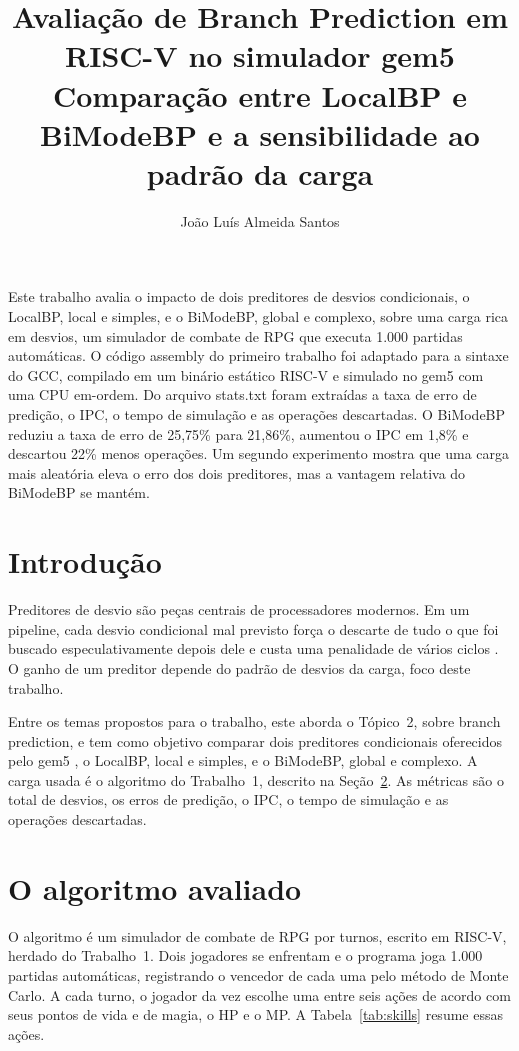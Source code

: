 \documentclass[12pt]{article}
\title{Avaliação de Branch Prediction em RISC-V no simulador gem5\\
Comparação entre LocalBP e BiModeBP e a sensibilidade ao padrão da carga}
\author{João Luís Almeida Santos\inst{1}}
\begin{document}
\maketitle

\begin{resumo}
  Este trabalho avalia o impacto de dois preditores de desvios
  condicionais, o LocalBP, local e simples, e o BiModeBP, global e
  complexo, sobre uma carga rica em desvios, um simulador de combate de RPG
  que executa 1.000 partidas automáticas.
  O código assembly do primeiro trabalho foi adaptado para a sintaxe do GCC,
  compilado em um binário estático RISC-V e simulado no gem5 com uma CPU
  em-ordem. Do arquivo stats.txt foram extraídas a taxa de erro de predição,
  o IPC, o tempo de simulação e as operações descartadas. O BiModeBP reduziu
  a taxa de erro de 25,75\% para 21,86\%, aumentou o IPC em 1,8\% e descartou
  22\% menos operações. Um segundo experimento mostra que uma carga mais
  aleatória eleva o erro dos dois preditores, mas a vantagem relativa do
  BiModeBP se mantém.
\end{resumo}

\section{Introdução}

Preditores de desvio são peças centrais de processadores modernos. Em um
pipeline, cada desvio condicional mal previsto força o descarte de tudo o
que foi buscado especulativamente depois dele e custa uma penalidade de
vários ciclos \cite{hennessy2017quantitative}. O ganho de um preditor
depende do padrão de desvios da carga, foco deste trabalho.

Entre os temas propostos para o trabalho, este aborda o Tópico~2, sobre
branch prediction, e tem como objetivo comparar dois preditores condicionais
oferecidos pelo gem5 \cite{binkert2011gem5}, o LocalBP, local e simples, e o
BiModeBP, global e complexo. A carga usada é o
algoritmo do Trabalho~1, descrito na Seção~\ref{sec:jogo}. As métricas
são o total de desvios, os erros de predição, o IPC, o tempo de simulação e
as operações descartadas.

\section{O algoritmo avaliado}
\label{sec:jogo}

O algoritmo é um simulador de combate de RPG por turnos, escrito em RISC-V,
herdado do Trabalho~1. Dois jogadores se enfrentam e o programa joga 1.000
partidas automáticas, registrando o vencedor de cada uma pelo método de
Monte Carlo. A cada turno, o jogador da vez escolhe uma entre seis ações de
acordo com seus pontos de vida e de magia, o HP e o MP. A
Tabela~\ref{tab:skills} resume essas ações.
\end{document}
